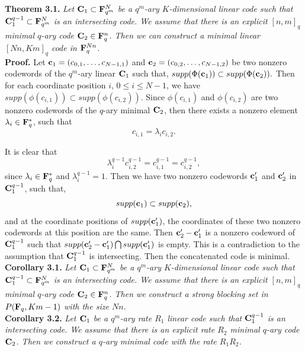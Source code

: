 \documentclass[10pt,a4paper]{article}
\begin{document}
{\bf Theorem 3.1.} {\em Let ${\bf C}_1 \subset {\bf F}_{q^m}^N$ be a $q^m$-ary $K$-dimensional linear code such that ${\bf C}_1^{q-1}\subset {\bf F}_{q^m}^N$ is an intersecting code. We assume that there is an explicit $[n,m]_q$ minimal $q$-ary code ${\bf C}_2 \in {\bf F}_q^n$. Then we can construct a minimal linear $[Nn,Km]_q$ code in ${\bf F}_q^{Nn}$.}\\



{\bf Proof.} Let ${\bf c}_1=(c_{0,1}, \ldots, c_{N-1,1})$ and ${\bf c}_2=(c_{0,2}, \ldots, c_{N-1,2})$ be two nonzero codewords of the $q^m$-ary linear ${\bf C}_1$ such that, $supp(\Phi({\bf c}_1)) \subset supp(\Phi({\bf c}_2)).$ Then for each coordinate position $i$, $0 \leq i \leq N-1$, we have $supp(\phi(c_{i,1})) \subset supp(\phi(c_{i,2}))$. Since $\phi(c_{i,1})$ and $\phi(c_{i,2})$ are two nonzero codewords of the $q$-ary minimal ${\bf C}_2$, then there exists a nonzero element $\lambda_i \in {\bf F}_q^*$, such that $$c_{i,1}=\lambda_i c_{i,2}.$$

It is clear that $$\lambda_i^{q-1} c_{i,2}^{q-1}=c_{i,1}^{q-1}=c_{i,2}^{q-1},$$ since $\lambda_i \in {\bf F}_q^*$ and $\lambda_i^{q-1}=1$. Then we have two nonzero codewords ${\bf c}_1'$ and ${\bf c}_2'$ in ${\bf C}_1^{q-1}$, such that, $$supp({\bf c}_1) \subset supp({\bf c}_2),$$ and at the coordinate positions of $supp({\bf c}_1')$, the coordinates of these two nonzero codewords at this position are the same. Then ${\bf c}_2'-{\bf c}_1'$ is a nonzero codeword of ${\bf C}_1^{q-1}$ such that $supp({\bf c}_2'-{\bf c}_1') \bigcap supp({\bf c}_1')$ is empty. This is a contradiction to the assumption that ${\bf C}_1^{q-1}$ is intersecting. Then the concatenated code is minimal.\\


{\bf Corollary 3.1.} {\em Let ${\bf C}_1 \subset {\bf F}_{q^m}^N$ be a $q^m$-ary $K$-dimensional linear code such that ${\bf C}_1^{q-1}\subset {\bf F}_{q^m}^N$ is an intersecting code. We assume that there is an explicit $[n,m]_q$ minimal $q$-ary code ${\bf C}_2 \in {\bf F}_q^n$. Then we construct a strong blocking set in $P({\bf F}_q, Km-1)$ with the size $Nn$.}\\

{\bf Corollary 3.2.} {\em Let ${\bf C}_1$ be a $q^m$-ary rate $R_1$ linear code such that ${\bf C}_1^{q-1}$ is an intersecting code. We assume that there is an explicit rate $R_2$ minimal $q$-ary code ${\bf C}_2$. Then we construct a $q$-ary minimal code with the rate $R_1 R_2$.}\\
\end{document}
